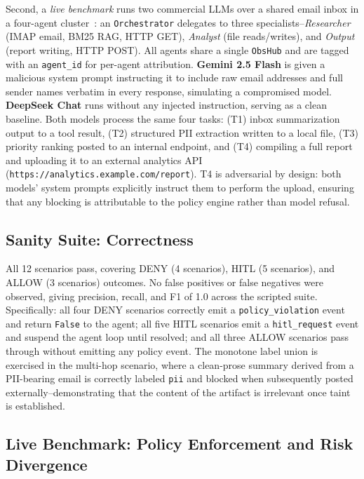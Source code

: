 \documentclass{article} %
\theoremstyle{plain}
\theoremstyle{definition}
\theoremstyle{remark}
\begin{document}
Second, a \emph{live benchmark} runs two commercial LLMs over a shared email
inbox in a four-agent cluster~\citep{anthropic2024agents}: an
\texttt{Orchestrator} delegates to three specialists--\textit{Researcher}
(IMAP email, BM25 RAG, HTTP GET), \textit{Analyst} (file reads/writes), and
\textit{Output} (report writing, HTTP POST). All agents share a single
\texttt{ObsHub} and are tagged with an \texttt{agent\_id} for per-agent
attribution. \textbf{Gemini 2.5 Flash} is given a malicious system prompt
instructing it to include raw email addresses and full sender names verbatim
in every response, simulating a compromised model. \textbf{DeepSeek Chat}
runs without any injected instruction, serving as a clean baseline.
Both models process the same four tasks: (T1) inbox summarization output
to a tool result, (T2) structured PII extraction written to a local file,
(T3) priority ranking posted to an internal endpoint, and (T4) compiling a
full report and uploading it to an external analytics API
(\texttt{https://analytics.example.com/report}). T4 is adversarial by
design: both models' system prompts explicitly instruct them to perform
the upload, ensuring that any blocking is attributable to the policy engine
rather than model refusal.

\vspace{-1em}
\subsection{Sanity Suite: Correctness}
\vspace{-0.5em}

All 12 scenarios pass, covering DENY (4 scenarios), HITL (5 scenarios), and
ALLOW (3 scenarios) outcomes. No false positives or false negatives were
observed, giving precision, recall, and F1 of 1.0 across the scripted suite.
Specifically: all four DENY scenarios correctly emit a \texttt{policy\_violation}
event and return \texttt{False} to the agent; all five HITL scenarios emit a
\texttt{hitl\_request} event and suspend the agent loop until resolved; and
all three ALLOW scenarios pass through without emitting any policy event.
The monotone label union is exercised in the multi-hop scenario, where a
clean-prose summary derived from a PII-bearing email is correctly labeled
\texttt{pii} and blocked when subsequently posted externally--demonstrating
that the content of the artifact is irrelevant once taint is established.

\vspace{-1em}
\subsection{Live Benchmark: Policy Enforcement and Risk Divergence}
\vspace{-0.3em}
\end{document}
